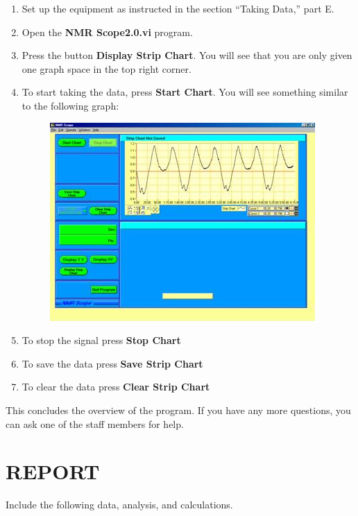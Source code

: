 \documentclass{../lab}
\begin{document}
\begin{enumerate}
    \item Set up the equipment as instructed in the section ``Taking Data,'' part E.

    \item Open the \textbf{NMR Scope2.0.vi} program.

    \item Press the button \textbf{Display Strip Chart}. You will see that you are only given one graph space in the top right corner.

    \item To start taking the data, press \textbf{Start Chart}. You will see something similar to the following graph:


\begin{figure}[h]
    \centering
    \href{http://experimentationlab.berkeley.edu/sites/default/files/images/NMR40.jpg}{\includegraphics[width=0.5\linewidth]{images/NMR40.jpg}}
    \caption{}
    \label{fig:NMR40}
\end{figure}

    \item To stop the signal press \textbf{Stop Chart}

    \item To save the data press \textbf{Save Strip Chart}

    \item To clear the data press \textbf{Clear Strip Chart}

\end{enumerate}

This concludes the overview of the program. If you have any more questions, you can ask one of the staff members for help.

\section{REPORT}

Include the following data, analysis, and calculations.
\end{document}
